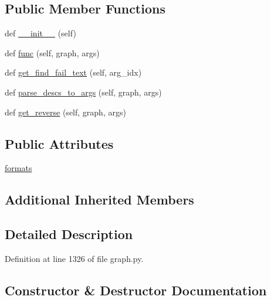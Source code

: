 \subsection*{Public Member Functions}
\begin{DoxyCompactItemize}
\item 
def \hyperlink{classlight__chats_1_1graph_1_1DropObjectFunction_a1afdc7d60d392a4c64764acbd130c13e}{\+\_\+\+\_\+init\+\_\+\+\_\+} (self)
\item 
def \hyperlink{classlight__chats_1_1graph_1_1DropObjectFunction_a2df3dbdd3032d47143978e645d12e928}{func} (self, graph, args)
\item 
def \hyperlink{classlight__chats_1_1graph_1_1DropObjectFunction_a8b23f2a71c27f14580a978f1b07e0471}{get\+\_\+find\+\_\+fail\+\_\+text} (self, arg\+\_\+idx)
\item 
def \hyperlink{classlight__chats_1_1graph_1_1DropObjectFunction_abd2a91a5d3fd3acb95c37fafed688aa0}{parse\+\_\+descs\+\_\+to\+\_\+args} (self, graph, args)
\item 
def \hyperlink{classlight__chats_1_1graph_1_1DropObjectFunction_a6708badf2a02ba13bcf40b0a01caaf37}{get\+\_\+reverse} (self, graph, args)
\end{DoxyCompactItemize}
\subsection*{Public Attributes}
\begin{DoxyCompactItemize}
\item 
\hyperlink{classlight__chats_1_1graph_1_1DropObjectFunction_a48f4d8c91a80deffb09e8a86c7f51e82}{formats}
\end{DoxyCompactItemize}
\subsection*{Additional Inherited Members}


\subsection{Detailed Description}
\begin{DoxyVerb}\end{DoxyVerb}
 

Definition at line 1326 of file graph.\+py.



\subsection{Constructor \& Destructor Documentation}
\mbox{\label{classlight__chats_1_1graph_1_1DropObjectFunction_a1afdc7d60d392a4c64764acbd130c13e}} 
